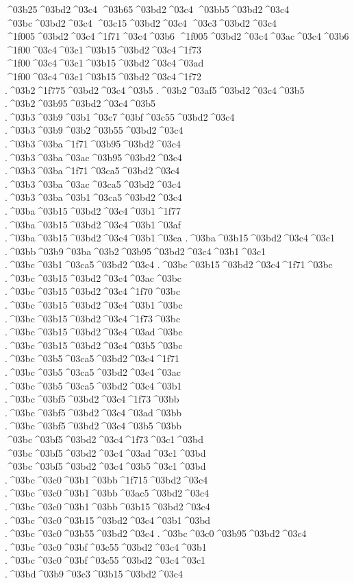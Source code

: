 {^^^^03b25^^^^03bd2^^^^03c4
^^^^03b65^^^^03bd2^^^^03c4
^^^^03bb5^^^^03bd2^^^^03c4
^^^^03bc^^^^03bd2^^^^03c4
^^^^03c15^^^^03bd2^^^^03c4
^^^^03c3^^^^03bd2^^^^03c4
^^^^1f005^^^^03bd2^^^^03c4^^^^1f71^^^^03c4^^^^03b6  ^^^^1f005^^^^03bd2^^^^03c4^^^^03ac^^^^03c4^^^^03b6
^^^^1f00^^^^03c4^^^^03c1^^^^03b15^^^^03bd2^^^^03c4^^^^1f73  ^^^^1f00^^^^03c4^^^^03c1^^^^03b15^^^^03bd2^^^^03c4^^^^03ad
^^^^1f00^^^^03c4^^^^03c1^^^^03b15^^^^03bd2^^^^03c4^^^^1f72
.^^^^03b2^^^^1f775^^^^03bd2^^^^03c4^^^^03b5  .^^^^03b2^^^^03af5^^^^03bd2^^^^03c4^^^^03b5
.^^^^03b2^^^^03b95^^^^03bd2^^^^03c4^^^^03b5
.^^^^03b3^^^^03b9^^^^03b1^^^^03c7^^^^03bf^^^^03c55^^^^03bd2^^^^03c4
.^^^^03b3^^^^03b9^^^^03b2^^^^03b55^^^^03bd2^^^^03c4
.^^^^03b3^^^^03ba^^^^1f71^^^^03b95^^^^03bd2^^^^03c4  .^^^^03b3^^^^03ba^^^^03ac^^^^03b95^^^^03bd2^^^^03c4
.^^^^03b3^^^^03ba^^^^1f71^^^^03ca5^^^^03bd2^^^^03c4  .^^^^03b3^^^^03ba^^^^03ac^^^^03ca5^^^^03bd2^^^^03c4
.^^^^03b3^^^^03ba^^^^03b1^^^^03ca5^^^^03bd2^^^^03c4
.^^^^03ba^^^^03b15^^^^03bd2^^^^03c4^^^^03b1^^^^1f77  .^^^^03ba^^^^03b15^^^^03bd2^^^^03c4^^^^03b1^^^^03af
.^^^^03ba^^^^03b15^^^^03bd2^^^^03c4^^^^03b1^^^^03ca
.^^^^03ba^^^^03b15^^^^03bd2^^^^03c4^^^^03c1
.^^^^03bb^^^^03b9^^^^03ba^^^^03b2^^^^03b95^^^^03bd2^^^^03c4^^^^03b1^^^^03c1
.^^^^03bc^^^^03b1^^^^03ca5^^^^03bd2^^^^03c4
.^^^^03bc^^^^03b15^^^^03bd2^^^^03c4^^^^1f71^^^^03bc  .^^^^03bc^^^^03b15^^^^03bd2^^^^03c4^^^^03ac^^^^03bc
.^^^^03bc^^^^03b15^^^^03bd2^^^^03c4^^^^1f70^^^^03bc
.^^^^03bc^^^^03b15^^^^03bd2^^^^03c4^^^^03b1^^^^03bc
.^^^^03bc^^^^03b15^^^^03bd2^^^^03c4^^^^1f73^^^^03bc  .^^^^03bc^^^^03b15^^^^03bd2^^^^03c4^^^^03ad^^^^03bc
.^^^^03bc^^^^03b15^^^^03bd2^^^^03c4^^^^03b5^^^^03bc
.^^^^03bc^^^^03b5^^^^03ca5^^^^03bd2^^^^03c4^^^^1f71  .^^^^03bc^^^^03b5^^^^03ca5^^^^03bd2^^^^03c4^^^^03ac
.^^^^03bc^^^^03b5^^^^03ca5^^^^03bd2^^^^03c4^^^^03b1
.^^^^03bc^^^^03bf5^^^^03bd2^^^^03c4^^^^1f73^^^^03bb  .^^^^03bc^^^^03bf5^^^^03bd2^^^^03c4^^^^03ad^^^^03bb
.^^^^03bc^^^^03bf5^^^^03bd2^^^^03c4^^^^03b5^^^^03bb
^^^^03bc^^^^03bf5^^^^03bd2^^^^03c4^^^^1f73^^^^03c1^^^^03bd  ^^^^03bc^^^^03bf5^^^^03bd2^^^^03c4^^^^03ad^^^^03c1^^^^03bd
^^^^03bc^^^^03bf5^^^^03bd2^^^^03c4^^^^03b5^^^^03c1^^^^03bd
.^^^^03bc^^^^03c0^^^^03b1^^^^03bb^^^^1f715^^^^03bd2^^^^03c4  .^^^^03bc^^^^03c0^^^^03b1^^^^03bb^^^^03ac5^^^^03bd2^^^^03c4
.^^^^03bc^^^^03c0^^^^03b1^^^^03bb^^^^03b15^^^^03bd2^^^^03c4
.^^^^03bc^^^^03c0^^^^03b15^^^^03bd2^^^^03c4^^^^03b1^^^^03bd
.^^^^03bc^^^^03c0^^^^03b55^^^^03bd2^^^^03c4
.^^^^03bc^^^^03c0^^^^03b95^^^^03bd2^^^^03c4
.^^^^03bc^^^^03c0^^^^03bf^^^^03c55^^^^03bd2^^^^03c4^^^^03b1
.^^^^03bc^^^^03c0^^^^03bf^^^^03c55^^^^03bd2^^^^03c4^^^^03c1
.^^^^03bd^^^^03b9^^^^03c3^^^^03b15^^^^03bd2^^^^03c4
}
